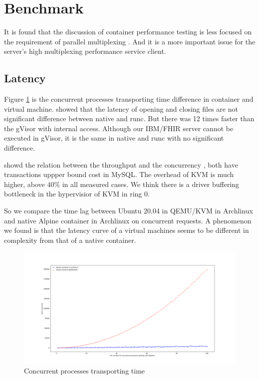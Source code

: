 \section{Benchmark}
It is found that the discussion of container performance testing is less
focused on the requirement of parallel multiplexing
\cite{7371699,KOZHIRBAYEV2017175,7095802,234857}. And it is a more
important issue for the server's high multiplexing performance service client.

\subsection{Latency}
Figure \ref{conc} is the concurrent processes transporting time
difference in container and virtual machine.
\textcite{234857} showed that the latency of opening and closing files
are not significant difference between native and runc. But there was 12 times
faster than the gVisor with internal access. Although our IBM/FHIR server
cannot be executed in gVisor, it is the same in native and runc with no
significant difference.

\textcite{7095802} showd the relation between the throughput and the concurrency 
, both have transactions uppper bound cost in MySQL. The overhead of KVM is
much higher, above 40\% in all measured cases. We think there is a driver
buffering bottleneck in the hypervisior of KVM in ring 0.

So we compare the time lag between Ubuntu 20.04 in QEMU/KVM in Archlinux
and native Alpine container in Archlinux on concurrent requests. 
A phenomenon we found is that the latency curve of a virtual
machines seems to be different in complexity from that of a native container.

\begin{figure}
    \centering
    \includegraphics[width=\textwidth]{src/concurrent.png}
    \caption{Concurrent processes transporting time}
    \label{conc}
\end{figure}
